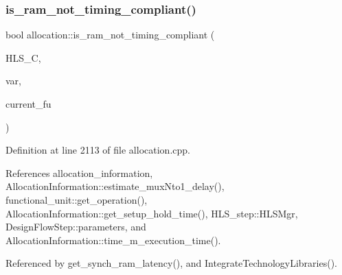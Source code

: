 \subsubsection{\texorpdfstring{is\+\_\+ram\+\_\+not\+\_\+timing\+\_\+compliant()}{is\_ram\_not\_timing\_compliant()}}
{\footnotesize\ttfamily bool allocation\+::is\+\_\+ram\+\_\+not\+\_\+timing\+\_\+compliant (\begin{DoxyParamCaption}\item[{const \hyperlink{hls__constraints_8hpp_ac394d1c5cd991614133724294a79182b}{H\+L\+S\+\_\+constraints\+Ref}}]{H\+L\+S\+\_\+C,  }\item[{unsigned int}]{var,  }\item[{\hyperlink{technology__node_8hpp_a33dd193b7bd6b987bf0d8a770a819fa7}{technology\+\_\+node\+Ref}}]{current\+\_\+fu }\end{DoxyParamCaption})\hspace{0.3cm}{\ttfamily [protected]}}



Definition at line 2113 of file allocation.\+cpp.



References allocation\+\_\+information, Allocation\+Information\+::estimate\+\_\+mux\+Nto1\+\_\+delay(), functional\+\_\+unit\+::get\+\_\+operation(), Allocation\+Information\+::get\+\_\+setup\+\_\+hold\+\_\+time(), H\+L\+S\+\_\+step\+::\+H\+L\+S\+Mgr, Design\+Flow\+Step\+::parameters, and Allocation\+Information\+::time\+\_\+m\+\_\+execution\+\_\+time().



Referenced by get\+\_\+synch\+\_\+ram\+\_\+latency(), and Integrate\+Technology\+Libraries().

